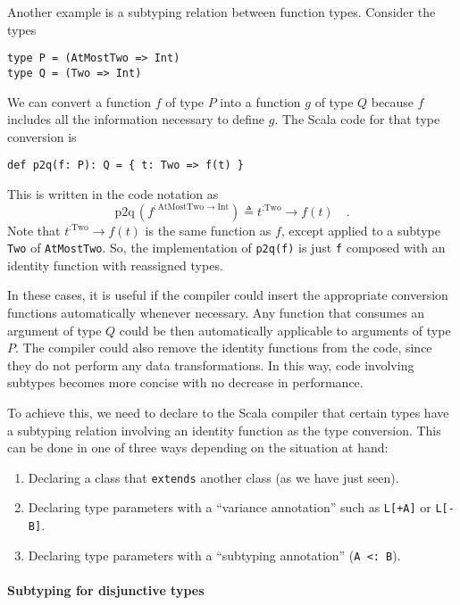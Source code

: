 Another example is a subtyping relation between function types. Consider
the types
\begin{lstlisting}
type P = (AtMostTwo => Int)
type Q = (Two => Int)
\end{lstlisting}
We can convert a function $f$ of type $P$ into a function $g$ of
type $Q$ because $f$ includes all the information necessary to define
$g$. The Scala code for that type conversion is
\begin{lstlisting}
def p2q(f: P): Q = { t: Two => f(t) }
\end{lstlisting}
This is written in the code notation as
\[
\text{p2q}\,(f^{:\text{AtMostTwo}\rightarrow\text{Int}})\triangleq t^{:\text{Two}}\rightarrow f(t)\quad.
\]
Note that $t^{:\text{Two}}\rightarrow f(t)$ is the same function
as $f$, except applied to a subtype \lstinline!Two! of \lstinline!AtMostTwo!.
So, the implementation of \lstinline!p2q(f)! is just \lstinline!f!
composed with an identity function with reassigned types.

In these cases, it is useful if the compiler could insert the appropriate
conversion functions automatically whenever necessary. Any function
that consumes an argument of type $Q$ could be then automatically
applicable to arguments of type $P$. The compiler could also remove
the identity functions from the code, since they do not perform any
data transformations. In this way, code involving subtypes becomes
more concise with no decrease in performance.

To achieve this, we need to declare to the Scala compiler that certain
types have a subtyping relation involving an identity function as
the type conversion. This can be done in one of three ways depending
on the situation at hand:
\begin{enumerate}
\item Declaring a class that \lstinline!extends! another class (as we have
just seen).
\item Declaring type parameters with a \textsf{``}variance annotation\textsf{''} such as
\lstinline!L[+A]! or \lstinline!L[-B]!.
\item Declaring type parameters with a \textsf{``}subtyping annotation\textsf{''} (\lstinline!A <: B!).
\end{enumerate}

\paragraph{Subtyping for disjunctive types }

